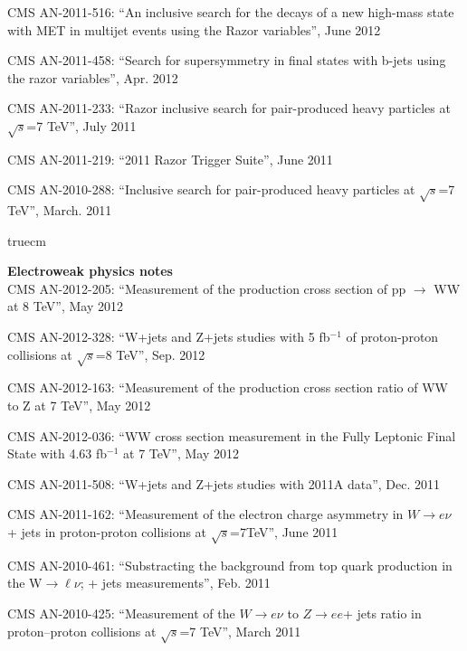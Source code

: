 CMS AN-2011-516: ``An inclusive search for the decays of a new high-mass state with MET in multijet events using the Razor variables'', June 2012

CMS AN-2011-458: ``Search for supersymmetry in final states with b-jets using the razor variables'', Apr. 2012

CMS AN-2011-233: ``Razor inclusive search for pair-produced heavy particles at $\sqrt{s}$=7 TeV'', July 2011

CMS AN-2011-219: ``2011 Razor Trigger Suite'', June 2011

CMS AN-2010-288: ``Inclusive search for pair-produced heavy particles at $\sqrt{s}$=7 TeV'', March. 2011





 truecm

        {\bf Electroweak physics notes}
        \\    

CMS AN-2012-205: ``Measurement of the production cross section of pp $\to$ WW at 8 TeV'', May 2012

CMS AN-2012-328: ``W+jets and Z+jets studies with 5 fb$^{-1}$ of proton-proton collisions at $\sqrt{s}$=8 TeV'', Sep. 2012

CMS AN-2012-163: ``Measurement of the production cross section ratio of WW to Z at 7 TeV'', May 2012

CMS AN-2012-036: ``WW cross section measurement in the Fully Leptonic Final State with 4.63 fb$^{-1}$ at 7 TeV'', May 2012

CMS AN-2011-508: ``W+jets and Z+jets studies with 2011A data'', Dec. 2011

CMS AN-2011-162: ``Measurement of the electron charge asymmetry in $W\to e\nu$ + jets in proton-proton collisions at $\sqrt{s}$=7TeV'', June 2011

CMS AN-2010-461: ``Substracting the background from top quark production in the W$\to\ell\nu$; + jets measurements'', Feb. 2011

CMS AN-2010-425: ``Measurement of the $W\to e\nu$ to $Z\to ee$+ jets ratio in proton--proton collisions at $\sqrt{s}$=7 TeV'', March 2011

